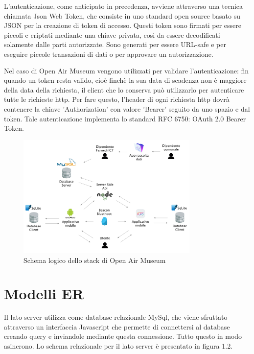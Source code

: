 L'autenticazione, come anticipato in precedenza, avviene attraverso una tecnica chiamata Json Web Token\cite{JWT}, che consiste in uno standard open source basato su JSON per la creazione di token di accesso. Questi token sono firmati per essere piccoli e criptati mediante una chiave privata, cosi da essere decodificati solamente dalle parti autorizzate. Sono generati per essere URL-safe e per eseguire piccole transazioni di dati o per approvare un autorizzazione.  \vspace{5mm}

Nel caso di Open Air Museum vengono utilizzati per validare l'autenticazione: fin quando un token resta valido, cioè finchè la sua data di scadenza non è maggiore della data della richiesta, il client che lo conserva può utilizzarlo per autenticare tutte le richieste http. Per fare questo, l'header di ogni richiesta http dovrà contenere la chiave 'Authorization' con valore 'Bearer' seguito da uno spazio e dal token. Tale autenticazione implementa lo standard RFC 6750: OAuth 2.0 Bearer Token\cite{Bearer}.

\begin{figure}[h]
\centering
\includegraphics[width=0.8\textwidth]{images/SchemaOpenAirMuseum.png}
\caption{Schema logico dello stack di Open Air Museum}
\end{figure}

\section{Modelli ER}\vspace{5mm}
		
	Il lato server utilizza come database relazionale MySql, che viene sfruttato attraverso un interfaccia Javascript che permette di connettersi al database creando query e inviandole mediante questa connessione. Tutto questo in modo asincrono. Lo schema relazionale per il lato server è presentato in figura 1.2.\vspace{5mm}
	
